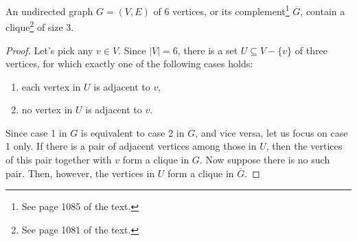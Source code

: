 \begin{theorem}
    An undirected graph $G=(V,E)$ of 6 vertices, or its complement\footnote{See page 1085 of the text.} $\overline{G}$, contain a clique\footnote{See page 1081 of the text.} of size 3.
\end{theorem}

\begin{proof}
    Let's pick any $v\in V$.
    Since $|V|=6$, there is a set $U\subseteq V-\{v\}$ of three vertices, for which exactly one of the following cases holds:
    \begin{enumerate}
        \item each vertex in $U$ is adjacent to $v$,
        \item no vertex in $U$ is adjacent to $v$.
    \end{enumerate}
    Since case 1 in $G$ is equivalent to case 2 in $\overline{G}$, and vice versa, let us focus on case 1 only.
    If there is a pair of adjacent vertices among those in $U$, then the vertices of this pair together with $v$ form a clique in $G$.
    Now suppose there is no such pair.
    Then, however, the vertices in $U$ form a clique in $\overline{G}$.
\end{proof}

